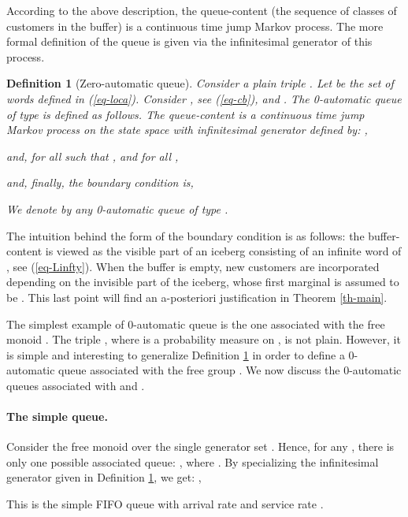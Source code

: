 \documentclass[11pt,a4paper]{article}
\newtheorem{definition}[theorem]{Definition}
\theoremstyle{remark}
\def\eref#1{(\ref{#1})}
\begin{document}
\medskip

According to the above description, the queue-content (the
sequence of classes of customers in the buffer) is a continuous
time jump Markov process. The more formal definition of the queue
is given via the infinitesimal generator of this process.

\begin{definition}[Zero-automatic queue]\label{de-0aut}
Consider a plain triple .
Let  be the
set of words defined in \eref{eq-loca}. Consider
, see \eref{eq-cb},  and .
The {\em 0-automatic queue} of type 
is defined as follows. The {\em
  queue-content}  is a continuous time
jump Markov process on the state space  with infinitesimal generator
 defined by: ,

and, for all  such that , and for all
,

and, finally, the boundary condition is,

We denote by  any 0-automatic queue of type
.
\end{definition}

\remark\label{rm-bc} The intuition behind the form of the boundary
condition is as follows: the buffer-content is viewed as the
visible part of an iceberg consisting of an infinite word of
, see \eref{eq-Linfty}. When the buffer is empty, new
customers are incorporated depending on the invisible part of the
iceberg, whose first marginal is assumed to be . This last
point will find an a-posteriori justification in Theorem
\ref{th-main}.

\medskip

The simplest example of 0-automatic queue is the one associated
with the free monoid . The triple ,
where  is a probability measure on , is not plain.
However, it is simple and interesting to generalize Definition \ref{de-0aut}
in order to define a 0-automatic queue associated with the free
group . We now discuss the 0-automatic queues associated with 
 and . 

\paragraph{The simple queue.}

Consider the free monoid  over the single
generator set
.
Hence, for any , there is only one
possible associated queue: , where
. By specializing the infinitesimal generator 
given in Definition \ref{de-0aut}, we get: ,

This is the simple  FIFO queue with arrival rate
 and service rate .
\end{document}
